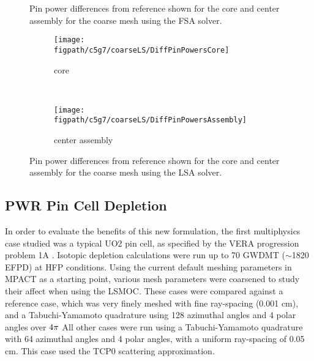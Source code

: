 {{{\begin{figure}[htbp]
\begin{subfigure}[t]{0.49\textwidth}
        \end{subfigure}
        \caption{Pin power differences from reference shown for the core and center assembly for the coarse mesh using the FSA solver.\label{figs:LSMOC:C5G7:CoarseFS:PinPowers}}
      \end{figure}
      \begin{figure}[htbp]
        \centering
        \begin{subfigure}[t]{0.49\textwidth}
          \centering
          \texttt{[image: \\figpath/c5g7/coarseLS/DiffPinPowersCore]}
          \caption{core\label{fig:LSMOC:C5G7:CoarseLS:PinPowers:Core}}
        \end{subfigure}%
        ~
        \begin{subfigure}[t]{0.49\textwidth}
          \centering
            \texttt{[image: \\figpath/c5g7/coarseLS/DiffPinPowersAssembly]}
            \caption{center assembly\label{fig:LSMOC:C5G7:CoarseLS:PinPowers:Assembly}}
        \end{subfigure}
        \caption{Pin power differences from reference shown for the core and center assembly for the coarse mesh using the LSA solver.\label{figs:LSMOC:C5G7:CoarseLS:PinPowers}}
      \end{figure}
    }

    \subsection{PWR Pin Cell Depletion}{\label{ssec:LSMOC:PWR Pin Cell Depletion}
      In order to evaluate the benefits of this new formulation, the first multiphysics case studied was a typical \ac{UO2} pin cell, as specified by the \ac{VERA} progression problem 1A \cite{VERAProblems}.
      Isotopic depletion calculations were run up to 70 \ac{GWDMT} ($\sim$1820 \ac{EFPD}) at \ac{HFP} conditions.
      Using the current default meshing parameters in MPACT as a starting point, various mesh parameters were coarsened to study their affect when using the \ac{LSMOC}.
      These cases were compared against a reference case, which was very finely meshed with fine ray-spacing (0.001 cm), and a Tabuchi-Yamamoto \cite{Yamamoto2005} quadrature using 128 azimuthal angles and 4 polar angles over $4\pi$
      All other cases were run using a Tabuchi-Yamamoto quadrature with 64 azimuthal angles and 4 polar angles, with a uniform ray-spacing of 0.05 cm.
      This case used the \ac{TCP0} scattering approximation.

}}}
